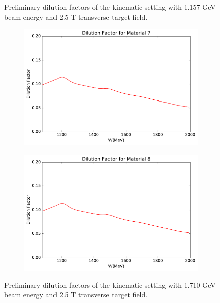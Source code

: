 \begin{figure}[h!]
\begin{subfigure}[t]{0.49\textwidth}
  \end{subfigure}
  \caption[Dilution factors with $E=1.157$ GeV and $B=2.5$ T.]{Preliminary dilution factors of the kinematic setting with 1.157 GeV beam energy and 2.5 T transverse target field. \label{C7S4F1}}
\end{figure}

\begin{figure}[h!]
  \centering
  \begin{subfigure}[t]{0.49\textwidth}
    \includegraphics[width=\textwidth]{figs/dilution-17102590-7.pdf}
  \end{subfigure}
  \begin{subfigure}[t]{0.49\textwidth}
    \includegraphics[width=\textwidth]{figs/dilution-17102590-8.pdf}
  \end{subfigure}
  \caption[Dilution factors with $E=1.710$ GeV and $B=2.5$ T.]{Preliminary dilution factors of the kinematic setting with 1.710 GeV beam energy and 2.5 T transverse target field. \label{C7S4F2}}
\end{figure}

